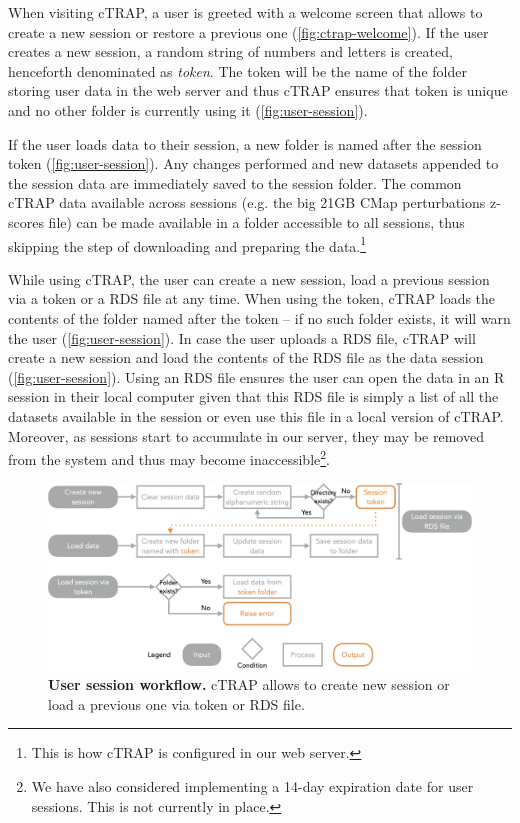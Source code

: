 When visiting cTRAP, a user is greeted with a welcome screen that allows to create a new session or restore a previous one (\autoref{fig:ctrap-welcome}). If the user creates a new session, a random string of numbers and letters is created, henceforth denominated as \emph{token}. The token will be the name of the folder storing user data in the web server and thus cTRAP ensures that token is unique and no other folder is currently using it (\autoref{fig:user-session}).

If the user loads data to their session, a new folder is named after the session token (\autoref{fig:user-session}). Any changes performed and new datasets appended to the session data are immediately saved to the session folder. The common cTRAP data available across sessions (e.g. the big 21GB CMap perturbations z-scores file) can be made available in a folder accessible to all sessions, thus skipping the step of downloading and preparing the data.\footnote{This is how cTRAP is configured in our web server.}

While using cTRAP, the user can create a new session, load a previous session via a token or a RDS file at any time. When using the token, cTRAP loads the contents of the folder named after the token – if no such folder exists, it will warn the user (\autoref{fig:user-session}). In case the user uploads a RDS file, cTRAP will create a new session and load the contents of the RDS file as the data session (\autoref{fig:user-session}). Using an RDS file ensures the user can open the data in an R session in their local computer given that this RDS file is simply a list of all the datasets available in the session or even use this file in a local version of cTRAP. Moreover, as sessions start to accumulate in our server, they may be removed from the system and thus may become inaccessible\footnote{We have also considered implementing a 14-day expiration date for user sessions. This is not currently in place.}.

\begin{figure}[!ht]
  \includegraphics[width=\textwidth]{images/ctrap/user-session}
  \centering
  \caption[User session workflow]{\textbf{User session workflow.} cTRAP allows to create new session or load a previous one via token or RDS file.}
  \label{fig:user-session}
\end{figure}


